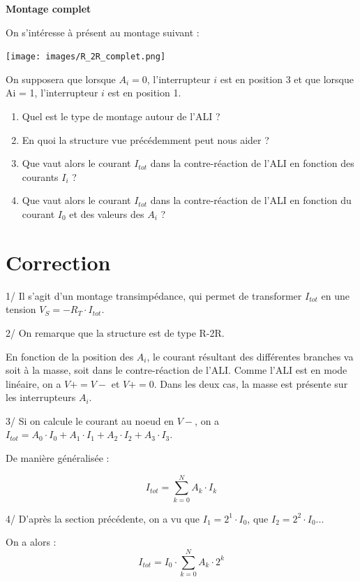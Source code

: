 \documentclass[10pt]{article} %
\begin{document}
\newpage
\textbf{Montage complet}

On s'intéresse à présent au montage suivant :

\begin{center}
	\texttt{[image: images/R\_2R\_complet.png]}
\end{center}

On supposera que lorsque $A_i = 0$, l'interrupteur $i$ est en position 3 et que lorsque Ai = 1, l'interrupteur $i$ est en position 1.

\begin{enumerate}
	\item Quel est le type de montage autour de l'ALI ?
	\item En quoi la structure vue précédemment peut nous aider ?
	\item Que vaut alors le courant $I_{tot}$ dans la contre-réaction de l'ALI en fonction des courants $I_i$ ?
	\item Que vaut alors le courant $I_{tot}$ dans la contre-réaction de l'ALI en fonction du courant $I_0$ et des
valeurs des $A_i$ ?
\end{enumerate}


\section*{Correction}

1/ Il s'agit d'un montage transimpédance, qui permet de transformer $I_{tot}$ en une tension $V_S = - R_T \cdot I_{tot}$.

\medskip

2/ On remarque que la structure est de type R-2R.

	En fonction de la position des $A_i$, le courant résultant des différentes branches va soit à la masse, soit dans le contre-réaction de l'ALI. Comme l'ALI est en mode linéaire, on a $V+ = V-$ et $V+ = 0$. Dans les deux cas, la masse est présente sur les interrupteurs $A_i$.

\medskip

3/ Si on calcule le courant au noeud en $V-$, on a $I_{tot} = A_0 \cdot I_0 + A_1 \cdot I_1 + A_2 \cdot I_2 + A_3 \cdot I_3$.
	
	De manière généralisée : 
	
	$$I_{tot} = \sum_{k = 0}^{N} A_k\cdot I_k$$
	
\medskip
	
4/ D'après la section précédente, on a vu que $I_1 = 2^1 \cdot I_0$, que $I_2 = 2^2 \cdot I_0$...
	
	On a alors : $$I_{tot} = I_0 \cdot \sum_{k = 0}^{N} A_k\cdot 2^k$$
\end{document}
